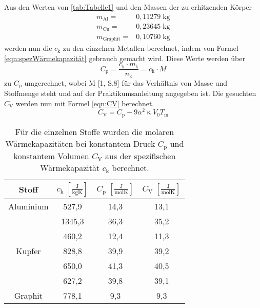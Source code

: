 \documentclass[titlepage = firstcover]{scrartcl}
\begin{document}
            Aus den Werten von \ref{tab:Tabelle1} und den Massen der zu erhitzenden Körper
            \begin{align*}
                m_{\text{Al}} =& 0,11279 \; \text{kg} \\
                m_{\text{Cu}} =& 0,23645 \; \text{kg} \\
                m_{\text{Graphit}} =& 0,10760 \; \text{kg}
            \end{align*}
            werden nun die $c_{\text{k}}$ zu den einzelnen Metallen berechnet, indem von 
            Formel \eqref{eqn:spezWärmekapazität} gebrauch gemacht wird. Diese Werte werden über
            \begin{equation*}
                C_{\text{p}} = \frac{c_{\text{k}} \cdot m_{\text{k}}}{n_{\text{k}}} = c_{\text{k}} \cdot M
            \end{equation*} 
            zu $C_{\text{p}}$ umgerechnet, wobei M [1, S.8] für das Verhältnis von Masse und Stoffmenge steht und auf der Praktikumsanleitung angegeben ist. 
            Die gesuchten $C_{\text{V}}$ werden nun mit Formel \eqref{eqn:CV} berechnet.
            \begin{equation}
                C_{\text{V}} = C_{\text{p}} - 9 \alpha^2 \upkappa  V_0 T_{\text{m}}
                \label{eqn:CV} 
            \end{equation}
            
            \begin{table}[h]
                \centering
                \caption{Für die einzelnen Stoffe wurden die molaren Wärmekapazitäten bei konstantem Druck $C_{\text{p}}$ und konstantem Volumen $C_{\text{V}}$ aus der spezifischen Wärmekapazität $c_{\text{k}}$ berechnet.}
                \label{tab:Tabelle2}

                \begin{tabular}{c c c c}
                    \toprule
                    {Stoff} & {$c_{\text{k}} \; [{\frac{\text{J}}{\text{kgK}}}] $} & {$C_{\text{p}} \; [{\frac{\text{J}}{\text{molK}}}]$} &  {$C_{\text{V}} \; [{\frac{\text{J}}{\text{molK}}}]$} \\
                    \midrule
                    Aluminium & 527,9 & 14,3 & 13,1 \\
                              & 1345,3 & 36,3 & 35,2 \\
                              & 460,2 & 12,4 & 11,3 \\
                    Kupfer    & 828,8 & 39,9 & 39,2 \\
                              & 650,0 & 41,3 & 40,5 \\
                              & 627,2 & 39,8 & 39,1 \\
                    Graphit   & 778,1 & 9,3 & 9,3 \\
                    \bottomrule
                \end{tabular}

            \end{table}
            
\end{document}
